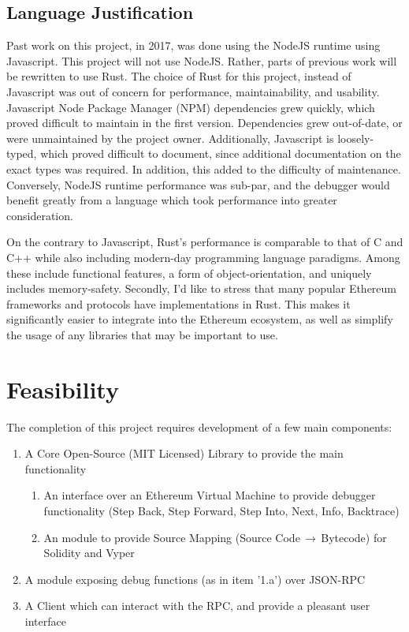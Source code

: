 \documentclass[]{report}
\begin{document}
\subsection{Language Justification}

Past work on this project, in 2017, was done using the NodeJS runtime using Javascript. This project will not use NodeJS. Rather, parts of previous work will be rewritten to use Rust. The choice of Rust for this project, instead of Javascript was out of concern for performance, maintainability, and usability. Javascript Node Package Manager (NPM) dependencies grew quickly, which proved difficult to maintain in the first version. Dependencies grew out-of-date, or were unmaintained by the project owner. Additionally, Javascript is loosely-typed, which proved difficult to document, since additional documentation on the exact types was required. In addition, this added to the difficulty of maintenance. Conversely, NodeJS runtime performance was sub-par, and the debugger would benefit greatly from a language which took performance into greater consideration.

On the contrary to Javascript, Rust's performance is comparable to that of C and C++ while also including modern-day programming language paradigms. Among these include functional features, a form of object-orientation, and uniquely includes memory-safety. Secondly, I'd like to stress that many popular Ethereum frameworks and protocols have implementations in Rust. This makes it significantly easier to integrate into the Ethereum ecosystem, as well as simplify the usage of any libraries that may be important to use.

\section{Feasibility}

The completion of this project requires development of a few main components:
\begin{enumerate}
	\item{A Core Open-Source (MIT Licensed) Library to provide the main functionality}
	\begin{enumerate}
		\item {An interface over an Ethereum Virtual Machine to provide debugger functionality (Step Back, Step Forward, Step Into, Next, Info, Backtrace)}
		\item {An module to provide Source Mapping (Source Code$\, \to\, $Bytecode) for Solidity and Vyper}
	\end{enumerate}
	\item{A module exposing debug functions (as in item '1.a') over JSON-RPC}
	\item{A Client which can interact with the RPC, and provide a pleasant user interface}
\end{enumerate}
\end{document}
